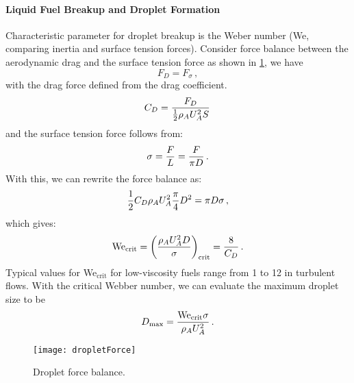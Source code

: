 \paragraph{Liquid Fuel Breakup and Droplet Formation}
Characteristic parameter for droplet breakup is the Weber number (We, comparing inertia and surface tension forces). Consider force balance between the aerodynamic drag and the surface tension force as shown in \cref{FIG_DROPLET_FORCE}, we have
\[
  F_D = F_\sigma\,,
\]
with the drag force defined from the drag coefficient. 
\[
C_D = {\frac{F_D}{{\frac{1}{2}}\rho_A U_A^2 S}}\,
\]
and the surface tension force follows from:
\[
\sigma = {\frac{F}{L}} = {\frac{F}{\pi D}}\,.
\]
With this, we can rewrite the force balance as:
\[
{\frac{1}{2}} C_D \rho_A U_A^2 {\frac{\pi}{4}} D^2 = \pi D \sigma\,,
\]
which gives:
\begin{equation}
  \text{We}_\text{crit} = \left({\frac{\rho_A U_A^2 D}{\sigma}}\right)_\text{crit} = {\frac{8}{C_D}}\,.
\end{equation}
Typical values for We$_\text{crit}$ for low-viscosity fuels range from 1 to 12 in turbulent flows. With the critical Webber number, we can evaluate the maximum droplet size to be
\begin{equation}
  D_\text{max} = {\frac{\text{We}_\text{crit}\sigma}{\rho_A U_A^2}}\,.
\end{equation}

\begin{figure}[!htb!]
 \centering
    {\texttt{[image: dropletForce]}}
    \caption{\label{FIG_DROPLET_FORCE}Droplet force balance.}
\end{figure}

